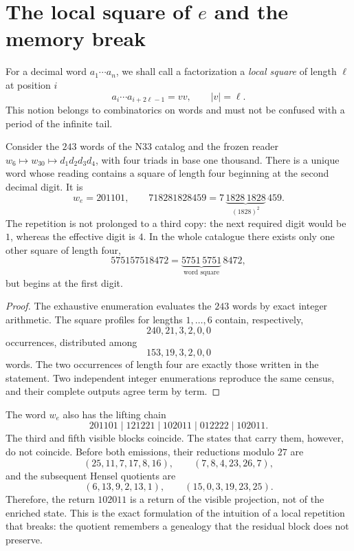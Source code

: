 \ifdefined\HMTRepetirResultadosTaxonomicos
\section{The local square of \texorpdfstring{\(e\)}{e} and the memory break}

For a decimal word \(a_1\cdots a_n\), we shall call a factorization a \emph{local square}
of length \(\ell\) at position \(i\)
\[
 a_i\cdots a_{i+2\ell-1}=vv,
 \qquad |v|=\ell.
\]
This notion belongs to combinatorics on words and must not be confused with
a period of the infinite tail.

\begin{theorem}
Consider the \(243\) words of the N33 catalog and the frozen reader
\(w_6\mapsto w_{30}\mapsto d_1d_2d_3d_4\), with four triads in base one thousand.
There is a unique word whose reading contains a square of length four
beginning at the second decimal digit. It is
\[
 w_e=201101,
 \qquad
 718281828459=7\,\underbrace{1828\,1828}_{(1828)^2}\,459.
\]
The repetition is not prolonged to a third copy: the next required digit
would be \(1\), whereas the effective digit is \(4\). In the whole catalogue there
exists only one other square of length four,
\[
 575157518472=\underbrace{5751\,5751}_{\text{word square}}\,8472,
\]
but begins at the first digit.
\end{theorem}

\begin{proof}
The exhaustive enumeration evaluates the \(243\) words by exact
integer arithmetic. The square profiles for lengths \(1,\ldots,6\) contain,
respectively,
\[
240, 21, 3, 2, 0, 0
\]
occurrences, distributed among
\[
153, 19, 3, 2, 0, 0
\]
words. The two occurrences of length four are exactly those written
in the statement. Two independent integer enumerations reproduce the same
census, and their complete outputs agree term by term.
\end{proof}

The word \(w_e\) also has the lifting chain
\[
201101\mid121221\mid102011\mid012222\mid102011.
\]
The third and fifth visible blocks coincide. The states that carry them,
however, do not coincide. Before both emissions, their reductions
modulo \(27\) are
\[
(25,11,7,17,8,16),
\qquad
(7,8,4,23,26,7),
\]
and the subsequent Hensel quotients are
\[
(6,13,9,2,13,1),
\qquad
(15,0,3,19,23,25).
\]
Therefore, the return \(102011\) is a return of the visible projection, not
of the enriched state. This is the exact formulation of the intuition of a
local repetition that breaks: the quotient remembers a genealogy that the
residual block does not preserve.

